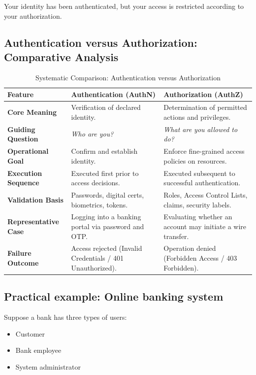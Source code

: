 Your identity has been authenticated, but your access is restricted according to your authorization.

\subsection{Authentication versus Authorization: Comparative Analysis}

\begin{table}[htbp]
\centering
\caption{Systematic Comparison: Authentication versus Authorization}
\label{tab:authn_vs_authz}
\begin{tabularx}{\textwidth}{p{3.0cm} p{5.5cm} X}
\toprule
\textbf{Feature} & \textbf{Authentication (AuthN)} & \textbf{Authorization (AuthZ)} \\
\midrule
\textbf{Core Meaning} & Verification of declared identity. & Determination of permitted actions and privileges. \\
\textbf{Guiding Question} & \textit{Who are you?} & \textit{What are you allowed to do?} \\
\textbf{Operational Goal} & Confirm and establish identity. & Enforce fine-grained access policies on resources. \\
\textbf{Execution Sequence} & Executed first prior to access decisions. & Executed subsequent to successful authentication. \\
\textbf{Validation Basis} & Passwords, digital certs, biometrics, tokens. & Roles, Access Control Lists, claims, security labels. \\
\textbf{Representative Case} & Logging into a banking portal via password and OTP. & Evaluating whether an account may initiate a wire transfer. \\
\textbf{Failure Outcome} & Access rejected (Invalid Credentials / 401 Unauthorized). & Operation denied (Forbidden Access / 403 Forbidden). \\
\bottomrule
\end{tabularx}
\end{table}


\subsection{Practical example: Online banking system}

Suppose a bank has three types of users:

\begin{itemize}
\item Customer
\item Bank employee
\item System administrator
\end{itemize}

